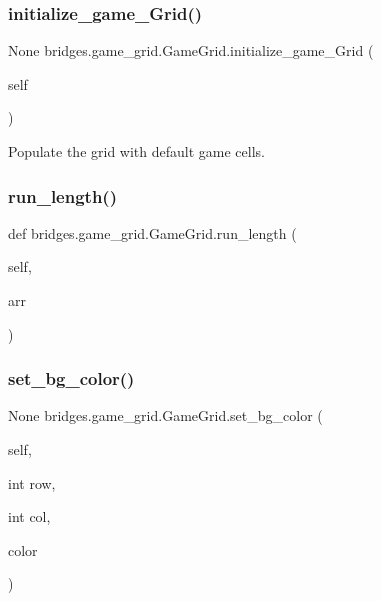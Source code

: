 \subsubsection{\texorpdfstring{initialize\_game\_Grid()}{initialize\_game\_Grid()}}
{\footnotesize\ttfamily  None bridges.\+game\+\_\+grid.\+Game\+Grid.\+initialize\+\_\+game\+\_\+\+Grid (\begin{DoxyParamCaption}\item[{}]{self }\end{DoxyParamCaption})}



Populate the grid with default game cells. 

\mbox{\label{classbridges_1_1game__grid_1_1_game_grid_a80f0ce020baf3d5fe53cbd719fbe78e5}} 
\subsubsection{\texorpdfstring{run\_length()}{run\_length()}}
{\footnotesize\ttfamily def bridges.\+game\+\_\+grid.\+Game\+Grid.\+run\+\_\+length (\begin{DoxyParamCaption}\item[{}]{self,  }\item[{}]{arr }\end{DoxyParamCaption})}

\mbox{\label{classbridges_1_1game__grid_1_1_game_grid_ac3622d877ccb7d955baf279ebf849557}} 
\subsubsection{\texorpdfstring{set\_bg\_color()}{set\_bg\_color()}}
{\footnotesize\ttfamily  None bridges.\+game\+\_\+grid.\+Game\+Grid.\+set\+\_\+bg\+\_\+color (\begin{DoxyParamCaption}\item[{}]{self,  }\item[{int}]{row,  }\item[{int}]{col,  }\item[{}]{color }\end{DoxyParamCaption})}



